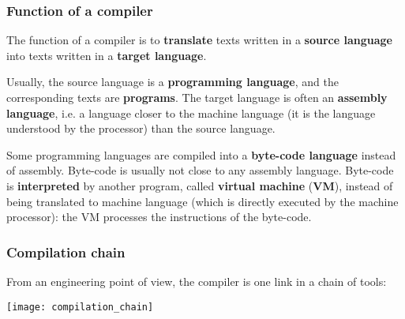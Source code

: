 % 
\begin{frame}
\frametitle{Function of a compiler}

The function of a compiler is to \textbf{translate} texts written in a
\textbf{source language} into texts written in a \textbf{target
  language}.

\bigskip

Usually, the source language is a \textbf{programming language}, and
the corresponding texts are \textbf{programs}. The target language
is often an \textbf{assembly language}, i.e. a language closer to the
machine language (it is the language understood by the processor) than
the source language.

\bigskip

Some programming languages are compiled into a \textbf{byte-code
  language} instead of assembly. Byte-code is usually not close to any
assembly language. Byte-code is \textbf{interpreted} by another
program, called \textbf{virtual machine} (\textbf{VM}), instead of
being translated to machine language (which is directly executed by
the machine processor): the VM processes the instructions of the
byte-code.

\end{frame}

% 
\begin{frame}
\frametitle{Compilation chain}

From an engineering point of view, the compiler is one link in a chain
of tools:
\begin{center}
\texttt{[image: compilation\_chain]}
\end{center}

\end{frame}

